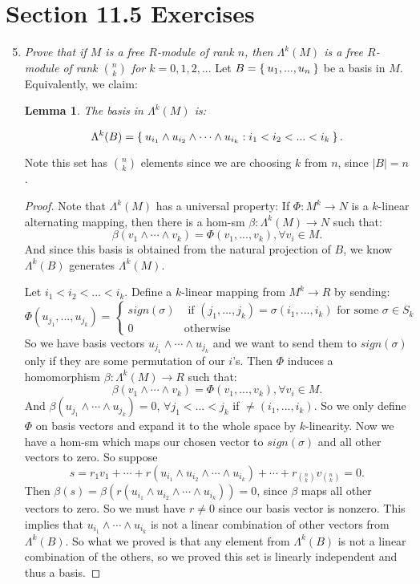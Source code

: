 \documentclass[10pt,oneside,reqno]{amsart}
\theoremstyle{plain}
\newtheorem{lem}[theorem]{Lemma}
\theoremstyle{definition}
\theoremstyle{remark}
\begin{document}
\section*{Section 11.5 Exercises}
\begin{enumerate}[label=\arabic*.]
\setcounter{enumi}{4}
\item \textit{Prove that if $M$ is a free $R$-module of rank $n$, then $\Lambda^k(M)$ is a free $R$-module of rank $\binom{n}{k}$ for $k = 0,1,2,...$} 
Let $B = \Set{u_1,...,u_n}$ be a basis in $M$. Equivalently, we claim:
\begin{lem}
 The basis in $\Lambda^k(M)$ is:
 
 $$
 \Lambda^k(B) = \Set{u_{i_1} \wedge u_{i_2} \wedge \cdots \wedge u_{i_k}: i_1 < i_2 < ... < i_k}.
 $$
\end{lem}
Note this set has $\binom{n}{k}$ elements since we are choosing $k$ from $n$, since $|B| = n$. 
\begin{proof}
 Note that $\Lambda^k(M)$ has a universal property: If $\Phi:M^k \to N$ is a $k$-linear alternating mapping, then there is a hom-sm $\beta:\Lambda^k(M) \to N$ such that: 
 $$
 \beta(v_1 \wedge \cdots \wedge v_k) = \Phi(v_1,...,v_k), \forall v_i \in M.
 $$
 And since this basis is obtained from the natural projection of $B$, we know $\Lambda^k(B)$ generates $\Lambda^k(M)$.


Let $i_1 < i_2 < ... < i_k$. Define a $k$-linear mapping from $M^k \to R$ by sending: 
$$
\Phi(u_{j_1},...,u_{j_k}) = \begin{cases}
sign(\sigma) & \text{ if }(j_1,...,j_k) = \sigma(i_1,...,i_k) \text{ for some }\sigma \in S_k\\
0 & \text{otherwise}
\end{cases}
$$
So we have basis vectors $u_{j_1}\wedge \cdots \wedge u_{j_k}$ and we want to send them to $sign(\sigma)$ only if they are some permutation of our $i$'s. Then $\Phi$ induces a homomorphism $\beta:\Lambda^k(M) \to R$ such that:
$$
 \beta(v_1 \wedge \cdots \wedge v_k) = \Phi(v_1,...,v_k), \forall v_i \in M.
 $$
And $\beta(u_{j_1}  \wedge \cdots \wedge u_{j_k}) = 0$, $\forall j_1 < ...< j_k$ if $\neq (i_1,...,i_k)$. So we only define $\Phi$ on basis vectors and expand it to the whole space by $k$-linearity. Now we have a hom-sm which maps our chosen vector to $sign(\sigma)$ and all other vectors to zero. So suppose 
$$
s = r_1v_1 + \cdots + r( u_{i_1} \wedge u_{i_2} \wedge \cdots \wedge u_{i_k}) + \cdots + r_{\binom{n}{k}}v_{\binom{n}{k}} = 0.
$$
Then $\beta(s) = \beta(r( u_{i_1} \wedge u_{i_2} \wedge \cdots \wedge u_{i_k})) = 0$, since $\beta$ maps all other vectors to zero. So we must have $r \neq 0$ since our basis vector is nonzero. 
 This implies that $u_{i_1}  \wedge \cdots \wedge u_{i_k}$ is not a linear combination of other vectors from $\Lambda^k(B)$. So what we proved is that any element from $\Lambda^k(B)$ is not a linear combination of the others, so we proved this set is linearly independent and thus a basis. 
\end{proof}


\end{enumerate}
\end{document}
